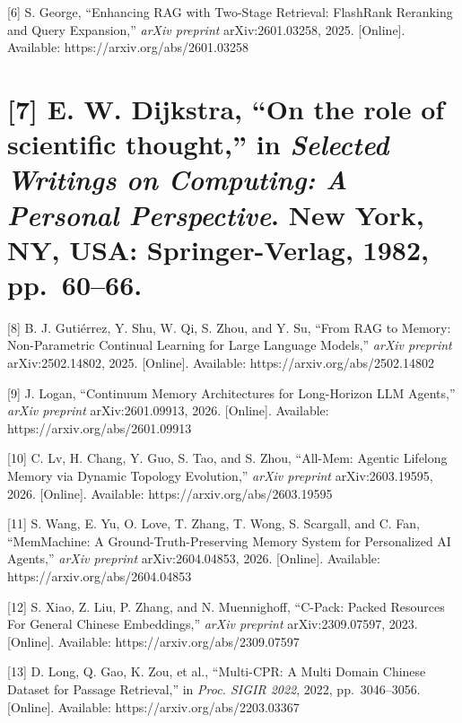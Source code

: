 {[}6{]} S. George, ``Enhancing RAG with Two-Stage Retrieval: FlashRank
Reranking and Query Expansion,'' \emph{arXiv preprint} arXiv:2601.03258,
2025. {[}Online{]}. Available: https://arxiv.org/abs/2601.03258

\section{\texorpdfstring{{[}7{]} E. W. Dijkstra, ``On the role of
scientific thought,'' in \emph{Selected Writings on Computing: A
Personal Perspective}. New York, NY, USA: Springer-Verlag, 1982,
pp.~60--66.}{{[}7{]} E. W. Dijkstra, ``On the role of scientific thought,'' in Selected Writings on Computing: A Personal Perspective. New York, NY, USA: Springer-Verlag, 1982, pp.~60--66.}}\label{e.-w.-dijkstra-on-the-role-of-scientific-thought-in-selected-writings-on-computing-a-personal-perspective.-new-york-ny-usa-springer-verlag-1982-pp.-6066.}

{[}8{]} B. J. Gutiérrez, Y. Shu, W. Qi, S. Zhou, and Y. Su, ``From RAG
to Memory: Non-Parametric Continual Learning for Large Language
Models,'' \emph{arXiv preprint} arXiv:2502.14802, 2025. {[}Online{]}.
Available: https://arxiv.org/abs/2502.14802

{[}9{]} J. Logan, ``Continuum Memory Architectures for Long-Horizon LLM
Agents,'' \emph{arXiv preprint} arXiv:2601.09913, 2026. {[}Online{]}.
Available: https://arxiv.org/abs/2601.09913

{[}10{]} C. Lv, H. Chang, Y. Guo, S. Tao, and S. Zhou, ``All-Mem:
Agentic Lifelong Memory via Dynamic Topology Evolution,'' \emph{arXiv
preprint} arXiv:2603.19595, 2026. {[}Online{]}. Available:
https://arxiv.org/abs/2603.19595

{[}11{]} S. Wang, E. Yu, O. Love, T. Zhang, T. Wong, S. Scargall, and C.
Fan, ``MemMachine: A Ground-Truth-Preserving Memory System for
Personalized AI Agents,'' \emph{arXiv preprint} arXiv:2604.04853, 2026.
{[}Online{]}. Available: https://arxiv.org/abs/2604.04853

{[}12{]} S. Xiao, Z. Liu, P. Zhang, and N. Muennighoff, ``C-Pack: Packed
Resources For General Chinese Embeddings,'' \emph{arXiv preprint}
arXiv:2309.07597, 2023. {[}Online{]}. Available:
https://arxiv.org/abs/2309.07597

{[}13{]} D. Long, Q. Gao, K. Zou, et al., ``Multi-CPR: A Multi Domain
Chinese Dataset for Passage Retrieval,'' in \emph{Proc. SIGIR 2022},
2022, pp.~3046--3056. {[}Online{]}. Available:
https://arxiv.org/abs/2203.03367
